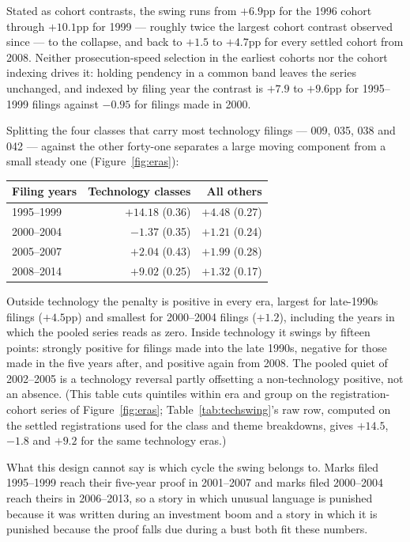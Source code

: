 Stated as cohort contrasts, the swing runs from $+6.9$pp for the 1996
cohort through $+10.1$pp for 1999 --- roughly twice the largest cohort
contrast observed since --- to the collapse, and back to $+1.5$ to
$+4.7$pp for every settled cohort from 2008. Neither prosecution-speed
selection in the earliest cohorts nor the cohort indexing drives it:
holding pendency in a common band leaves the series unchanged, and
indexed by filing year the contrast is $+7.9$ to $+9.6$pp for 1995--1999
filings against $-0.95$ for filings made in 2000.

Splitting the four classes that carry most technology filings --- 009,
035, 038 and 042 --- against the other forty-one separates a large moving
component from a small steady one (Figure~\ref{fig:eras}):

\begin{center}\small
\begin{tabular}{lrr}
\toprule
Filing years & Technology classes & All others \\
\midrule
1995--1999 & $+14.18$ (0.36) & $+4.48$ (0.27) \\
2000--2004 & $-1.37$ (0.35) & $+1.21$ (0.24) \\
2005--2007 & $+2.04$ (0.43) & $+1.99$ (0.28) \\
2008--2014 & $+9.02$ (0.25) & $+1.32$ (0.17) \\
\bottomrule
\end{tabular}
\end{center}

\noindent Outside technology the penalty is positive in every era,
largest for late-1990s filings ($+4.5$pp) and smallest for 2000--2004
filings ($+1.2$), including the years in which the pooled series reads as
zero. Inside technology it swings by fifteen points: strongly positive
for filings made into the late 1990s, negative for those made in the
five years after, and positive again from 2008. The pooled quiet of
2002--2005 is a technology reversal partly offsetting a non-technology
positive, not an absence. (This table cuts quintiles within era and
group on the registration-cohort series of Figure~\ref{fig:eras};
Table~\ref{tab:techswing}'s raw row, computed on the settled
registrations used for the class and theme breakdowns, gives $+14.5$,
$-1.8$ and $+9.2$ for the same technology eras.)

What this design cannot say is which cycle the swing belongs to. Marks
filed 1995--1999 reach their five-year proof in 2001--2007 and marks
filed 2000--2004 reach theirs in 2006--2013, so a story in which unusual
language is punished because it was written during an investment boom and
a story in which it is punished because the proof falls due during a bust
both fit these numbers.

